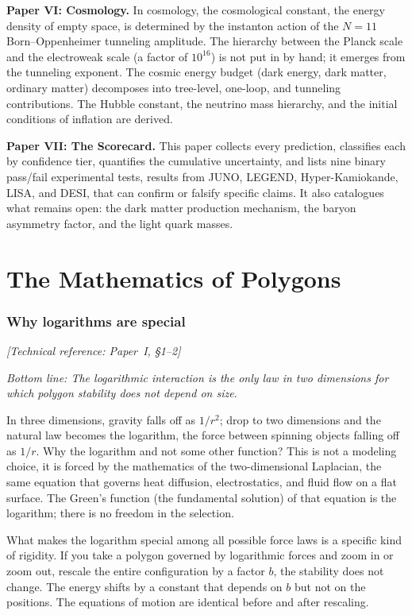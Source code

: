 \textbf{Paper VI: Cosmology.} In cosmology, the cosmological constant, the energy
density of empty space, is determined by the instanton action of the
$N = 11$ Born--Oppenheimer tunneling amplitude. The hierarchy between
the Planck scale and the electroweak scale (a factor of $10^{16}$)
is not put in by hand; it emerges from the tunneling exponent. The
cosmic energy budget (dark energy, dark matter, ordinary matter)
decomposes into tree-level, one-loop, and tunneling contributions.
The Hubble constant, the neutrino mass hierarchy, and the initial
conditions of inflation are derived.

\textbf{Paper VII: The Scorecard.} This paper collects every
prediction, classifies each by confidence tier, quantifies the
cumulative uncertainty, and lists nine binary pass/fail experimental
tests, results from JUNO, LEGEND, Hyper-Kamiokande, LISA, and
DESI, that can confirm or falsify specific claims. It also
catalogues what remains open: the dark matter production mechanism,
the baryon asymmetry factor, and the light quark masses.


\newpage


\part{The Mathematics of Polygons}


\section{Why logarithms are special}
\noindent\textit{[Technical reference: Paper~I, \S1--2]}

\medskip

\noindent\textit{Bottom line: The logarithmic interaction is the only
law in two dimensions for which polygon stability does not depend on
size.}

\medskip

In three dimensions, gravity falls off as $1/r^2$; drop to two
dimensions and the natural law becomes the logarithm, the force
between spinning objects falling off as $1/r$. Why the logarithm
and not some other function? This is not a modeling choice, it
is forced by the mathematics of the two-dimensional Laplacian,
the same equation that governs heat diffusion, electrostatics,
and fluid flow on a flat surface. The Green's function (the
fundamental solution) of that equation is the logarithm; there
is no freedom in the selection.

What makes the logarithm special among all possible force laws is a
specific kind of rigidity. If you take a polygon governed by
logarithmic forces and zoom in or zoom out, rescale the entire
configuration by a factor $b$, the stability does not change. The
energy shifts by a constant that depends on $b$ but not on the
positions. The equations of motion are identical before and after
rescaling.

